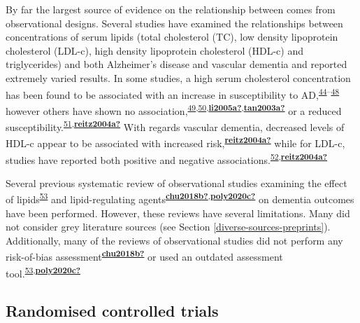 \documentclass[a4paper, twoside]{templates/ociamthesis}
\begin{document}
By far the largest source of evidence on the relationship between comes from observational designs. Several studies have examined the relationships between concentrations of serum lipids (total cholesterol (TC), low density lipoprotein cholesterol (LDL-c), high density lipoprotein cholesterol (HDL-c) and triglycerides) and both Alzheimer's disease and vascular dementia and reported extremely varied results. In some studies, a high serum cholesterol concentration has been found to be associated with an increase in susceptibility to AD,\textsuperscript{\protect\hyperlink{ref-kivipelto2002}{44}--\protect\hyperlink{ref-whitmer2005}{48}} however others have shown no association,\textsuperscript{\protect\hyperlink{ref-mainous2005}{49},\protect\hyperlink{ref-mielke2010}{50},\protect\hyperlink{ref-li2005a}{\textbf{li2005a?}},\protect\hyperlink{ref-tan2003a}{\textbf{tan2003a?}}} or a reduced susceptibility.\textsuperscript{\protect\hyperlink{ref-mielke2005}{51},\protect\hyperlink{ref-reitz2004a}{\textbf{reitz2004a?}}} With regards vascular dementia, decreased levels of HDL-c appear to be associated with increased risk,\textsuperscript{\protect\hyperlink{ref-reitz2004a}{\textbf{reitz2004a?}}} while for LDL-c, studies have reported both positive and negative associations.\textsuperscript{\protect\hyperlink{ref-moroney1999}{52},\protect\hyperlink{ref-reitz2004a}{\textbf{reitz2004a?}}}

Several previous systematic review of observational studies examining the effect of lipids\textsuperscript{\protect\hyperlink{ref-anstey}{53}} and lipid-regulating agents\textsuperscript{\protect\hyperlink{ref-chu2018b}{\textbf{chu2018b?}},\protect\hyperlink{ref-poly2020c}{\textbf{poly2020c?}}} on dementia outcomes have been performed. However, these reviews have several limitations. Many did not consider grey literature sources (see Section \ref{diverse-sources-preprints}). Additionally, many of the reviews of observational studies did not perform any risk-of-bias assessment\textsuperscript{\protect\hyperlink{ref-chu2018b}{\textbf{chu2018b?}}} or used an outdated assessment tool.\textsuperscript{\protect\hyperlink{ref-anstey}{53},\protect\hyperlink{ref-poly2020c}{\textbf{poly2020c?}}}

\hypertarget{randomised-controlled-trials}{%
\subsection{Randomised controlled trials}\label{randomised-controlled-trials}}
\end{document}
